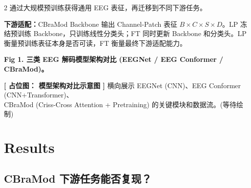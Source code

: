 \documentclass[12pt, a0paper]{article}
\renewcommand{\Large}{\fontsize{34}{42}\selectfont}
\renewcommand{\small}{\fontsize{18}{24}\selectfont}
\newcommand{\figcaption}[1]{%
    \vspace{0.3em}
    {\color{myblue}\bfseries #1}
    \vspace{0.2em}
}
\newcommand{\placeholder}[2]{%
    \begin{center}
    \colorbox{mygray!12}{\parbox{0.9\columnwidth}{%
        \centering
        \vspace{1.5em}
        {\Large\bfseries\color{mygray} [ 占位图： #1 ]}
        \vspace{0.8em}
        {\small\color{mygray} #2}
        \vspace{1.5em}
    }}
    \end{center}
}
\begin{document}
\begin{multicols}{2}
通过大规模预训练获得通用 EEG 表征，再迁移到不同下游任务。

\textbf{下游适配：}CBraMod Backbone 输出 Channel-Patch 表征 $B \times C \times S \times D$。LP 冻结预训练 Backbone，只训练线性分类头；FT 同时更新 Backbone 和分类头。LP 衡量预训练表征本身是否可读，FT 衡量最终下游适配能力。

\vspace{0.8em}

\figcaption{Fig 1. 三类 EEG 解码模型架构对比 (EEGNet / EEG Conformer / CBraMod)。}
\placeholder{模型架构对比示意图}{%
    横向展示 EEGNet (CNN)、EEG Conformer (CNN+Transformer)、\\
    CBraMod (Criss-Cross Attention + Pretraining) 的关键模块和数据流。\quad (等待绘制)}

\section{Results}

\subsection{CBraMod 下游任务能否复现？}


\end{multicols}
\end{document}
